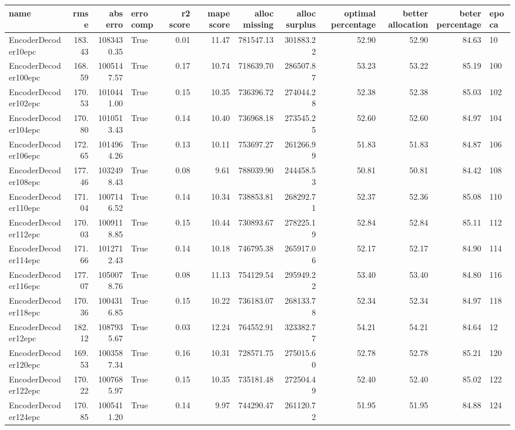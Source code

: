 \begin{tabular}{lrrlrrrrrrrl}
\toprule
name & rmse & abs erro & erro comp & r2 score & mape score & alloc missing & alloc surplus & optimal percentage & better allocation & beter percentage & epoca \\
\midrule
EncoderDecoder10epc & 183.43 & 1083430.35 & True & 0.01 & 11.47 & 781547.13 & 301883.22 & 52.90 & 52.90 & 84.63 & 10 \\
EncoderDecoder100epc & 168.59 & 1005147.57 & True & 0.17 & 10.74 & 718639.70 & 286507.87 & 53.23 & 53.22 & 85.19 & 100 \\
EncoderDecoder102epc & 170.53 & 1010441.00 & True & 0.15 & 10.35 & 736396.72 & 274044.28 & 52.38 & 52.38 & 85.03 & 102 \\
EncoderDecoder104epc & 170.80 & 1010513.43 & True & 0.14 & 10.40 & 736968.18 & 273545.25 & 52.60 & 52.60 & 84.97 & 104 \\
EncoderDecoder106epc & 172.65 & 1014964.26 & True & 0.13 & 10.11 & 753697.27 & 261266.99 & 51.83 & 51.83 & 84.87 & 106 \\
EncoderDecoder108epc & 177.46 & 1032498.43 & True & 0.08 & 9.61 & 788039.90 & 244458.53 & 50.81 & 50.81 & 84.42 & 108 \\
EncoderDecoder110epc & 171.04 & 1007146.52 & True & 0.14 & 10.34 & 738853.81 & 268292.71 & 52.37 & 52.36 & 85.08 & 110 \\
EncoderDecoder112epc & 170.03 & 1009118.85 & True & 0.15 & 10.44 & 730893.67 & 278225.19 & 52.84 & 52.84 & 85.11 & 112 \\
EncoderDecoder114epc & 171.66 & 1012712.43 & True & 0.14 & 10.18 & 746795.38 & 265917.06 & 52.17 & 52.17 & 84.90 & 114 \\
EncoderDecoder116epc & 177.07 & 1050078.76 & True & 0.08 & 11.13 & 754129.54 & 295949.22 & 53.40 & 53.40 & 84.80 & 116 \\
EncoderDecoder118epc & 170.36 & 1004316.85 & True & 0.15 & 10.22 & 736183.07 & 268133.78 & 52.34 & 52.34 & 84.97 & 118 \\
EncoderDecoder12epc & 182.12 & 1087935.67 & True & 0.03 & 12.24 & 764552.91 & 323382.77 & 54.21 & 54.21 & 84.64 & 12 \\
EncoderDecoder120epc & 169.53 & 1003587.34 & True & 0.16 & 10.31 & 728571.75 & 275015.60 & 52.78 & 52.78 & 85.21 & 120 \\
EncoderDecoder122epc & 170.22 & 1007685.97 & True & 0.15 & 10.35 & 735181.48 & 272504.49 & 52.40 & 52.40 & 85.02 & 122 \\
EncoderDecoder124epc & 170.85 & 1005411.20 & True & 0.14 & 9.97 & 744290.47 & 261120.72 & 51.95 & 51.95 & 84.88 & 124 \\

\end{tabular}
